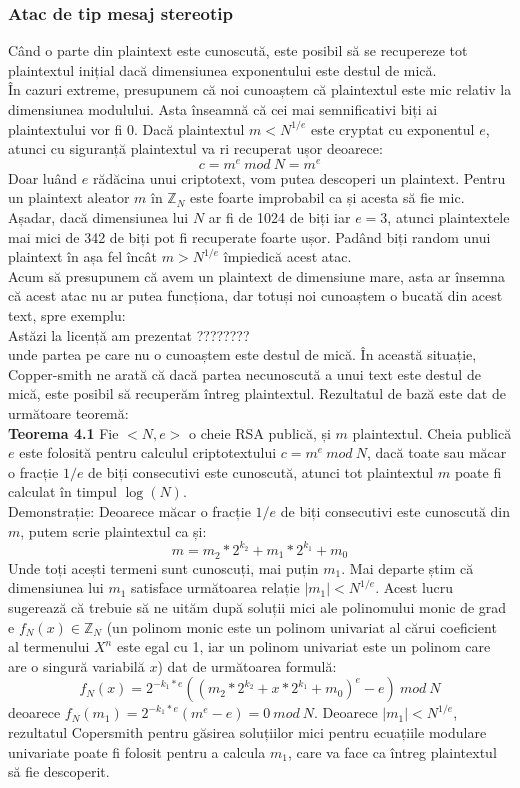 \documentclass[12]{report}
\begin{document}
\subsubsection{Atac de tip mesaj stereotip}
Când o parte din plaintext este cunoscută, este posibil să se recupereze tot plaintextul inițial dacă dimensiunea exponentului este destul de mică. \\
În cazuri extreme, presupunem că noi cunoaștem că plaintextul este mic relativ la dimensiunea modulului. Asta înseamnă că cei mai semnificativi biți ai plaintextului vor fi 0. Dacă plaintextul $m < N^{1/e}$ este cryptat cu exponentul $e$, atunci cu siguranță plaintextul va ri recuperat ușor deoarece:
$$ c = m^e \ mod \ N = m^e$$
Doar luând $e$ rădăcina unui criptotext, vom putea descoperi un plaintext. Pentru un plaintext aleator $m$ în $\mathbb{Z}_N$ este foarte improbabil ca și acesta să fie mic. \\
Așadar, dacă dimensiunea lui $N$ ar fi de 1024 de biți iar $e=3$, atunci plaintextele mai mici de 342 de biți pot fi recuperate foarte ușor. Padând biți random unui plaintext în așa fel încât $m > N^{1/e}$ împiedică acest atac. \\
Acum să presupunem că avem un plaintext de dimensiune mare, asta ar însemna că acest atac nu ar putea funcționa, dar totuși noi cunoaștem o bucată din acest text, spre exemplu: \\
Astăzi la licență am prezentat ???????? \\
unde partea pe care nu o cunoaștem este destul de mică. În această situație, Copper-smith \cite{cooper} \cite{cooper2} ne arată că dacă partea necunoscută a unui text este destul de mică, este posibil să recuperăm întreg plaintextul. Rezultatul de bază este dat de următoare teoremă: \\
\textbf{Teorema 4.1}
Fie $<N,e>$ o cheie RSA publică, și $m$ plaintextul. Cheia publică $e$ este folosită pentru calculul criptotextului $c = m^e \ mod \ N$, dacă toate sau măcar o fracție $1/e$ de biți consecutivi este cunoscută, atunci tot plaintextul $m$ poate fi calculat în timpul $\log(N)$. \\
Demonstrație: Deoarece măcar o fracție $1/e$ de biți consecutivi este cunoscută din $m$, putem scrie plaintextul ca și:
$$ m= m_{2}^{} * 2^{k_2} + m_1 * 2^{k_1} + m_0$$
Unde toți acești termeni sunt cunoscuți, mai puțin $m_1$. Mai departe știm  că dimensiunea lui $m_1$ satisface următoarea relație $ |m_1| < N^{1/e}$. Acest lucru sugerează că trebuie să ne uităm după soluții mici ale polinomului monic de grad e $f_N(x) \in \mathbb{Z}_N $ (un polinom monic este un polinom univariat al cărui coeficient al termenului $X^n$ este egal cu 1, iar un polinom univariat este un polinom care are o singură variabilă $x$) dat de următoarea formulă:
$$ f_N(x) = 2^{-k_1 * e}((m_2 * 2^{k_2} + x*2^{k_1} + m_0)^e - e) \ mod \ N$$
deoarece $f_N(m_1)= 2^{-k_1 *e}(m^e-e)=0 \ mod \ N$. Deoarece $ |m_1| < N^{1/e}$, rezultatul Copersmith pentru găsirea soluțiilor mici pentru ecuațiile modulare univariate poate fi folosit pentru a calcula $m_1$, care va face ca întreg plaintextul să fie descoperit. 
\end{document}
